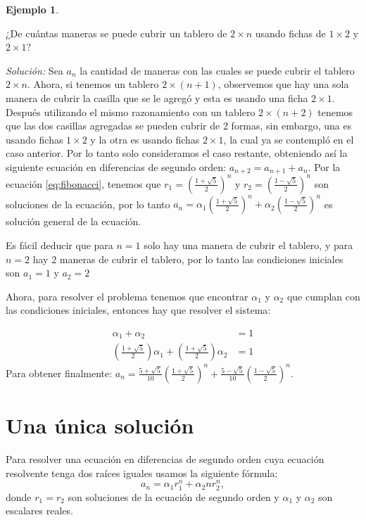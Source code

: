 \documentclass{report}
\theoremstyle{definition}
\newtheorem{ejemplo}[teorema]{Ejemplo}
\begin{document}
\begin{ejemplo}
\label{sec:fichas}

¿De cuántas maneras se puede cubrir un tablero de $2\times n$ usando
fichas de $1\times 2$ y $2\times 1$?

\textit{Solución:} Sea $a_n$ la cantidad de maneras con las cuales se
puede cubrir el tablero $2\times n$. Ahora, si tenemos un tablero
$2\times (n+1)$, observemos que hay una sola manera de cubrir la
casilla que se le agregó y esta es usando una ficha $2\times 1$.
Después utilizando el mismo razonamiento con un tablero
$2\times (n+2)$ tenemos que las dos casillas agregadas se pueden
cubrir de 2 formas, sin embargo, una es usando fichas $1\times 2$ y la
otra es usando fichas $2\times 1$, la cual ya se contempló en el caso
anterior. Por lo tanto solo consideramos el caso restante, obteniendo
así la siguiente ecuación en diferencias de segundo orden:
$a_{n+2}=a_{n+1}+a_n$. Por la ecuación \eqref{eq:fibonacci}, tenemos
que $r_1=(\frac{1+\sqrt{5}}{2})^n$ y $r_2=(\frac{1-\sqrt{5}}{2})^n$
son soluciones de la ecuación, por lo tanto
$a_n=\alpha_1(\frac{1+\sqrt{5}}{2})^n +
\alpha_2(\frac{1-\sqrt{5}}{2})^n$ es solución general de la ecuación.


Es fácil deducir que para $n=1$ solo hay una manera de cubrir el
tablero, y para $n=2$ hay 2 maneras de cubrir el tablero, por lo tanto
las condiciones iniciales son $a_1=1$ y $a_2=2$

Ahora, para resolver el problema tenemos que encontrar $\alpha_1$ y
$\alpha_2$ que cumplan con las condiciones iniciales, entonces hay que
resolver el sistema:

\begin{align*}
\alpha_{1} + \alpha_{2} &= 1\\
(\frac{1+\sqrt{5}}{2})\alpha_{1} + (\frac{1+\sqrt{5}}{2})\alpha_{2}&=1
\end{align*}
Para obtener finalmente:
$a_{n}= \frac{5+\sqrt{5}}{10}(\frac{1+\sqrt{5}}{2})^n +
\frac{5-\sqrt{5}}{10}(\frac{1-\sqrt{5}}{2})^n$.
\end{ejemplo}

\section{Una única solución}
\label{sec:unica}

Para resolver una ecuación en diferencias de segundo orden cuya
ecuación resolvente tenga dos raíces iguales usamos la siguiente fórmula:
\begin{equation}
 \label{raicesiguales}
 a_n=\alpha_1r_1^n +\alpha_2nr_2^n,
\end{equation}
donde $r_1=r_2$ son soluciones de la ecuación de segundo orden y
$\alpha_1$ y $\alpha_2$ son escalares reales.
\end{document}
